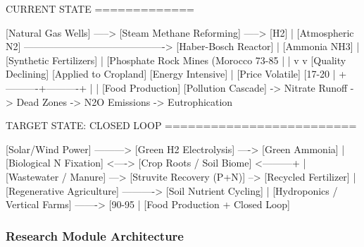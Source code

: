 \documentclass[11pt,letterpaper]{article}
\begin{document}
\begin{asciibox}
CURRENT STATE
=============

[Natural Gas Wells] -----> [Steam Methane Reforming] -----> [H2]
                                                               |
[Atmospheric N2] -------------------------------------------> [Haber-Bosch Reactor]
                                                               |
                                                          [Ammonia NH3]
                                                               |
                                                     [Synthetic Fertilizers]
                                                               |
[Phosphate Rock Mines (Morocco 73-85%
                 |                                            |
                 v                                            v
         [Quality Declining]                      [Applied to Cropland]
         [Energy Intensive]                               |
         [Price Volatile]                    [17-20%
                                                          |
                                               +----------+----------+
                                               |                     |
                                       [Food Production]    [Pollution Cascade]
                                                        -> Nitrate Runoff
                                                        -> Dead Zones
                                                        -> N2O Emissions
                                                        -> Eutrophication


TARGET STATE: CLOSED LOOP
=========================

[Solar/Wind Power] ---------> [Green H2 Electrolysis] ----> [Green Ammonia]
                                                                    |
[Biological N Fixation] <----> [Crop Roots / Soil Biome] <---------+
                                        |
[Wastewater / Manure] ---> [Struvite Recovery (P+N)] --> [Recycled Fertilizer]
                                        |
[Regenerative Agriculture] ----------> [Soil Nutrient Cycling]
                                        |
[Hydroponics / Vertical Farms] -------> [90-95%
                                        |
                                [Food Production + Closed Loop]
\end{asciibox}

\subsubsection{Research Module Architecture}
\end{document}
